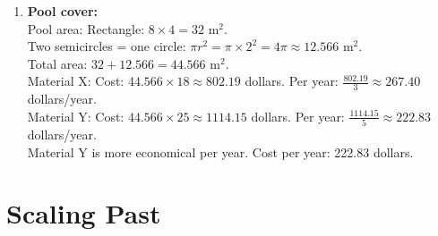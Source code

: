 \documentclass[12pt]{article}
\begin{document}
\begin{enumerate}[resume]
    \item \textbf{Pool cover:} \\
    Pool area: Rectangle: \( 8 \times 4 = 32\) m\(^2\). \\
    Two semicircles = one circle: \( \pi r^2 = \pi \times 2^2 = 4\pi \approx 12.566\) m\(^2\). \\
    Total area: \( 32 + 12.566 = 44.566\) m\(^2\). \\
    Material X: Cost: \( 44.566 \times 18 \approx 802.19\) dollars. Per year: \( \frac{802.19}{3} \approx 267.40\) dollars/year. \\
    Material Y: Cost: \( 44.566 \times 25 \approx 1114.15\) dollars. Per year: \( \frac{1114.15}{5} \approx 222.83\) dollars/year. \\
    Material Y is more economical per year. Cost per year: 222.83 dollars.
\end{enumerate}

\section*{Scaling Past}
\end{document}
